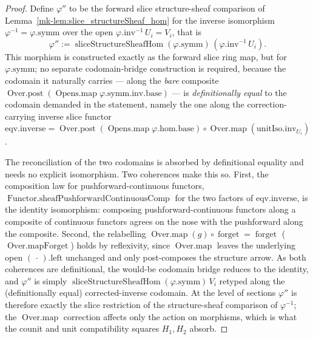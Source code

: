 \begin{proof}
  \leanok
  Define \(\varphi''\) to be the forward slice structure-sheaf comparison of
  Lemma~\ref{mk-lem:slice_structureSheaf_hom} for the inverse isomorphism \(\varphi^{-1} = \varphi.
  \mathrm{symm}\) over the open \(\varphi.\mathrm{inv}^{-1}\,U_i = V_i\), that is
  \[
    \varphi'' := \operatorname{sliceStructureSheafHom}(\varphi.\mathrm{symm})\,(\varphi.\mathrm{inv}^{-1}\,U_i).
  \]
  This morphism is constructed exactly as the forward slice ring map, but for \(\varphi.\mathrm{symm}\);
  no separate codomain-bridge construction is required, because the codomain it naturally carries ---
  along the \emph{bare} composite \(\operatorname{Over.post}(\operatorname{Opens.map}\varphi.\mathrm{symm}.
  \mathrm{inv}.\mathrm{base})\) --- is \emph{definitionally equal} to the codomain demanded in the
  statement, namely the one along the correction-carrying inverse slice functor
  \(\mathrm{eqv}.\mathrm{inverse} = \operatorname{Over.post}(\operatorname{Opens.map}\varphi.\mathrm{hom}.
  \mathrm{base}) \circ \operatorname{Over.map}(\mathrm{unitIso}.\mathrm{inv}_{U_i})\).

  The reconciliation of the two codomains is absorbed by definitional equality and needs no explicit
  isomorphism. Two coherences make this so. First, the composition law for pushforward-continuous
  functors, \(\operatorname{Functor.sheafPushforwardContinuousComp}\) for the two factors of
  \(\mathrm{eqv}.\mathrm{inverse}\), is the identity isomorphism:
  composing pushforward-continuous functors along a composite of continuous functors agrees on the nose
  with the pushforward along the composite. Second, the relabelling
  \(\operatorname{Over.map}(g) \circ \operatorname{forget} = \operatorname{forget}\)
  (\(\operatorname{Over.mapForget}\)) holds by reflexivity, since \(\operatorname{Over.map}\) leaves
  the underlying open \((\,\cdot\,).\mathrm{left}\) unchanged and only post-composes the structure
  arrow. As both coherences are definitional, the would-be codomain bridge reduces to the identity, and
  \(\varphi''\) is simply \(\operatorname{sliceStructureSheafHom}(\varphi.\mathrm{symm})\,V_i\) retyped
  along the (definitionally equal) corrected-inverse codomain. At the level of sections \(\varphi''\) is therefore
  exactly the slice restriction of the structure-sheaf comparison of \(\varphi^{-1}\); the
  \(\operatorname{Over.map}\) correction affects only the action on morphisms, which is what the counit
  and unit compatibility squares \(H_1, H_2\) absorb.
\end{proof}

